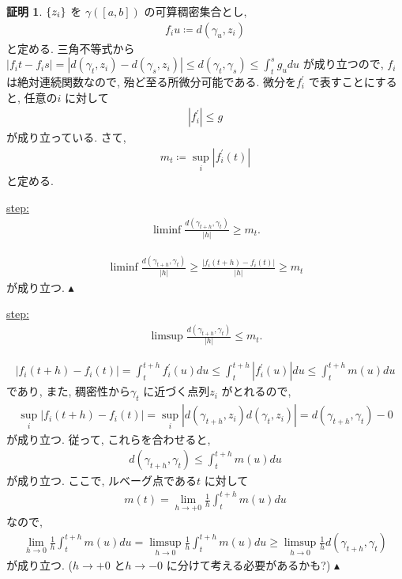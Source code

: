 \documentclass[10pt, fleqn, label-section=none]{bxjsarticle}
\theoremstyle{definition}
\newtheorem*{pf*}{証明}
\newcommand{\cbra}[1]{\mleft\{#1\mright\}}
\newcommand{\abs}[1]{\left|#1\right|}
\renewcommand{\;}{\, ; \,}
\newenvironment{claim}[1]{\par\noindent\underline{step:}\space#1}{}
\newenvironment{claimproof}[1]{\par\noindent{($\because$)}\space#1}{\hfill $\blacktriangle $}
\begin{document}
\begin{pf*}
$\cbra{z_i} $ を $\gamma([a,b])$ の可算稠密集合とし, 
\begin{align*} f_i u \coloneqq d (\gamma_u, z_i)  \end{align*}
と定める. 三角不等式から$\abs{f_i t - f_i s } = \abs{d (\gamma_t, z_i)  - d (\gamma_s, z_i)   }\leq d(\gamma_t, \gamma_s) \leq \int_t^s g_u du$  が成り立つので, $f_i$ は絶対連続関数なので, 殆ど至る所微分可能である. 微分を$f^\prime_i$ で表すことにすると, 任意の$i$ に対して
\begin{align*} \abs{f^\prime _i} \leq g\end{align*}
が成り立っている. さて, 
\begin{align*} m_t \coloneqq \sup_i \abs{f^\prime_i (t)}\end{align*}
と定める. 

\begin{claim}
\begin{align*} \liminf \frac{d(\gamma_{t+h} , \gamma_t)}{\abs h} \geq m_t . \end{align*}
\end{claim}
\begin{claimproof}
\begin{align*} \liminf \frac{d(\gamma_{t+h} , \gamma_t)}{\abs h} \geq  \frac{   \abs{f_i(t+h) - f_i (t) }   }{\abs h} \geq m_t\end{align*}
が成り立つ. 
\end{claimproof}

\begin{claim}
\begin{align*} \limsup \frac{d(\gamma_{t+h} , \gamma_t)}{\abs h} \leq m_t . \end{align*}
\end{claim}
\begin{claimproof}
\begin{align*}   \abs{f_i(t+h) - f_i (t) }  = \int_t ^ {t +h} f^\prime_i (u) du \leq \int_t^{t +h} \abs{f^\prime_i (u)} du \leq \int_t^ {t+h} m(u) du \end{align*}
であり, また, 稠密性から$\gamma_t$ に近づく点列$z_i$ がとれるので, 
\begin{align*} \sup_i   \abs{f_i(t+h) - f_i (t) }  = \sup_i \abs{d(\gamma_{t+h}, z_i)  d(\gamma_t, z_i)} = d(\gamma_{t +h} , \gamma_t) - 0 \end{align*} 
が成り立つ. 従って, これらを合わせると, 
\begin{align*} d(\gamma_{t +h} , \gamma_t) \leq \int_t ^ {t +h} m(u) du \end{align*}
が成り立つ. ここで, ルベーグ点である$t$ に対して
\begin{align*} m(t) = \lim_{h\rightarrow +0} \frac{1}{h} \int_t^{t+h} m(u) du  \end{align*} 
なので, 
\begin{align*}\lim_{h \rightarrow 0} \frac{1}{h} \int_t^{t+h} m(u) du = \limsup_{h \rightarrow 0}  \frac{1}{h} \int_t ^ {t +h} m(u) du  \geq \limsup_{h \rightarrow 0}  \frac{1}{h} d(\gamma_{t+h} , \gamma_t) \end{align*}
が成り立つ. ($h \rightarrow +0$ と$h \rightarrow -0$ に分けて考える必要があるかも?) 
\end{claimproof}


\end{pf*}
\end{document}
